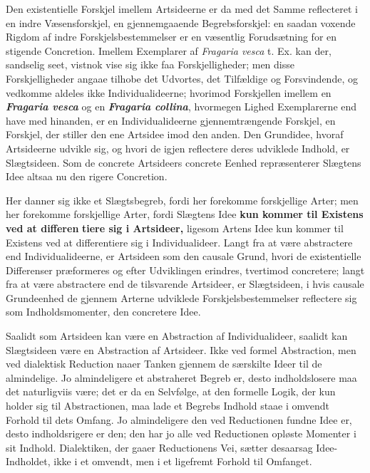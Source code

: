 \documentclass[11pt]{book}
\newcommand{\opage}[1]{\marginnote{\footnotesize\textit{[#1]}}}
\begin{document}
Den existentielle Forskjel imellem Artsideerne er da med det Samme
reflecteret i en indre Væsensforskjel, en gjennemgaaende
Begrebsforskjel: en saadan voxende Rigdom af indre
Forskjelsbestemmelser er en væsentlig Forudsætning for en stigende
Concretion. Imellem Exemplarer af \textit{Fragaria vesca} t. Ex. kan
der, sandselig seet, vistnok vise sig ikke faa Forskjelligheder; men
disse Forskjelligheder angaae tilhobe det Udvortes, det Tilfældige og
Forsvindende, og vedkomme aldeles ikke Individualideerne; hvorimod
Forskjellen imellem en \textbf{\textit{Fragaria vesca}} og en
\textbf{\textit{Fragaria collina}}, hvormegen Lighed Exemplarerne end
have med hinanden, er en Individualideerne gjennemtrængende Forskjel,
en Forskjel, der stiller den ene Artsidee imod den anden. Den
Grundidee, hvoraf Artsideerne udvikle sig, og hvori de igjen reflectere
deres udviklede Indhold, er Slægtsideen. Som de concrete Artsideers
concrete Eenhed repræsenterer Slægtens Idee altsaa nu den rigere
Concretion.

Her danner sig ikke et Slægtsbegreb, fordi her forekomme
forskjellige Arter; men her forekomme forskjellige Arter, fordi
Slægtens Idee \textbf{kun kommer til Existens ved at differen}\-%
\opage{325} \setcounter{footnote}{0}%
\textbf{tiere sig i Artsideer,} ligesom Artens Idee kun kommer til
Existens ved at differentiere sig i Individualideer. Langt fra at være
abstractere end Individualideerne, er Artsideen som den causale Grund,
hvori de existentielle Differenser præformeres og efter Udviklingen
erindres, tvertimod concretere; langt fra at være abstractere end de
tilsvarende Artsideer, er Slægtsideen, i hvis causale Grundeenhed de
gjennem Arterne udviklede Forskjelsbestemmelser reflectere sig som
Indholdsmomenter, den concretere Idee.

Saalidt som Artsideen kan være en Abstraction af Individualideer,
saalidt kan Slægtsideen være en Abstraction af Artsideer. Ikke ved
formel Abstraction, men ved dialektisk Reduction naaer Tanken
gjennem de særskilte Ideer til de almindelige. Jo almindeligere et
abstraheret Begreb er, desto indholdslosere maa det naturligviis være;
det er da en Selvfølge, at den formelle Logik, der kun holder sig til
Abstractionen, maa lade et Begrebs Indhold staae i omvendt Forhold
til dets Omfang. Jo almindeligere den ved Reductionen fundne Idee
er, desto indholdsrigere er den; den har jo alle ved Reductionen
opløste Momenter i sit Indhold. Dialektiken, der gaaer Reductionens
Vei, sætter desaarsag Idee-Indholdet, ikke i et omvendt, men i et
ligefremt Forhold til Omfanget.
\end{document}
